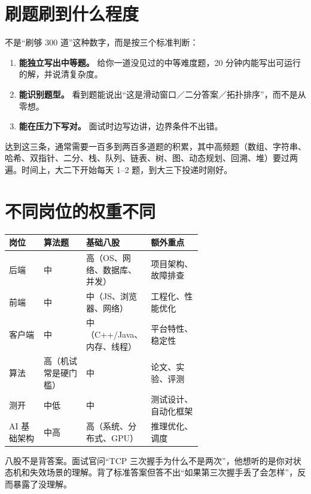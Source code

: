 \documentclass[UTF8,zihao=5,openany]{ctexbook}
\begin{document}
\section{刷题刷到什么程度}
不是“刷够 300 道”这种数字，而是按三个标准判断：

\begin{enumerate}
\item \textbf{能独立写出中等题。} 给你一道没见过的中等难度题，20 分钟内能写出可运行的解，并说清复杂度。
\item \textbf{能识别题型。} 看到题能说出“这是滑动窗口／二分答案／拓扑排序”，而不是从零想。
\item \textbf{能在压力下写对。} 面试时边写边讲，边界条件不出错。
\end{enumerate}

达到这三条，通常需要一百多到两百多道题的积累，其中高频题（数组、字符串、哈希、双指针、二分、栈、队列、链表、树、图、动态规划、回溯、堆）要过两遍。时间上，大二下开始每天 1--2 题，到大三下投递时刚好。

\section{不同岗位的权重不同}
\begin{center}\small
\begin{tabularx}{\linewidth}{p{0.18\linewidth}p{0.22\linewidth}p{0.24\linewidth}Y}
\toprule
岗位 & 算法题 & 基础八股 & 额外重点 \\
\midrule
后端 & 中 & 高（OS、网络、数据库、并发） & 项目架构、故障排查 \\
前端 & 中 & 中（JS、浏览器、网络） & 工程化、性能优化 \\
客户端 & 中 & 中（C++/Java、内存、线程） & 平台特性、稳定性 \\
算法 & 高（机试常是硬门槛） & 中 & 论文、实验、评测 \\
测开 & 中低 & 中 & 测试设计、自动化框架 \\
AI 基础架构 & 中高 & 高（系统、分布式、GPU） & 推理优化、调度 \\
\bottomrule
\end{tabularx}
\end{center}

八股不是背答案。面试官问“TCP 三次握手为什么不是两次”，他想听的是你对状态机和失效场景的理解。背了标准答案但答不出“如果第三次握手丢了会怎样”，反而暴露了没理解。
\end{document}
